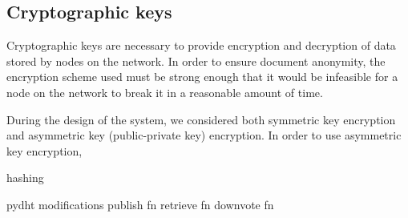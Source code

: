 \subsection{Cryptographic keys}

Cryptographic keys are necessary to provide encryption and decryption of data stored by nodes on the network. In order to ensure document anonymity,
the encryption scheme used must be strong enough that it would be infeasible for a node on the network to break it in a reasonable amount of time.

During the design of the system, we considered both symmetric key encryption and asymmetric key (public-private key) encryption. In order to use
asymmetric key encryption, 

hashing

pydht modifications
	publish fn
	retrieve fn
	downvote fn
